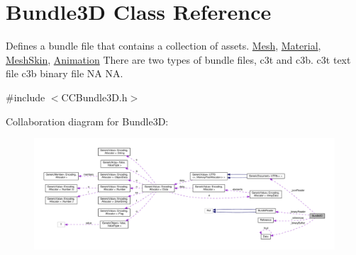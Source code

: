 \hypertarget{classBundle3D}{}\section{Bundle3D Class Reference}
\label{classBundle3D}


Defines a bundle file that contains a collection of assets. \hyperlink{classMesh}{Mesh}, \hyperlink{classMaterial}{Material}, \hyperlink{classMeshSkin}{Mesh\+Skin}, \hyperlink{classAnimation}{Animation} There are two types of bundle files, c3t and c3b. c3t text file c3b binary file  NA  NA.  




{\ttfamily \#include $<$C\+C\+Bundle3\+D.\+h$>$}



Collaboration diagram for Bundle3D\+:
\nopagebreak
\begin{figure}[H]
\begin{center}
\leavevmode
\includegraphics[width=350pt]{classBundle3D__coll__graph}
\end{center}
\end{figure}
